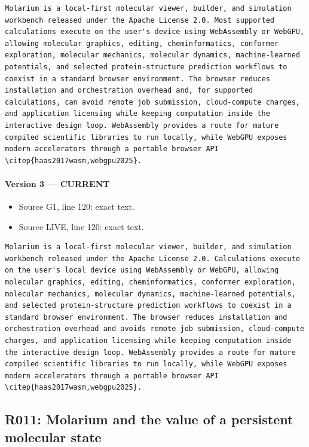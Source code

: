 \documentclass[11pt]{article}
\begin{document}
\begin{lstlisting}
Molarium is a local-first molecular viewer, builder, and simulation workbench released under the Apache License 2.0. Most supported calculations execute on the user's device using WebAssembly or WebGPU, allowing molecular graphics, editing, cheminformatics, conformer exploration, molecular mechanics, molecular dynamics, machine-learned potentials, and selected protein-structure prediction workflows to coexist in a standard browser environment. The browser reduces installation and orchestration overhead and, for supported calculations, can avoid remote job submission, cloud-compute charges, and application licensing while keeping computation inside the interactive design loop. WebAssembly provides a route for mature compiled scientific libraries to run locally, while WebGPU exposes modern accelerators through a portable browser API \citep{haas2017wasm,webgpu2025}.
\end{lstlisting}

\paragraph{Version 3 --- CURRENT}

\begin{itemize}[leftmargin=*]
\item Source G1, line 120: exact text.
\item Source LIVE, line 120: exact text.
\end{itemize}

\begin{lstlisting}
Molarium is a local-first molecular viewer, builder, and simulation workbench released under the Apache License 2.0. Calculations execute on the user's local device using WebAssembly or WebGPU, allowing molecular graphics, editing, cheminformatics, conformer exploration, molecular mechanics, molecular dynamics, machine-learned potentials, and selected protein-structure prediction workflows to coexist in a standard browser environment. The browser reduces installation and orchestration overhead and avoids remote job submission, cloud-compute charges, and application licensing while keeping computation inside the interactive design loop. WebAssembly provides a route for mature compiled scientific libraries to run locally, while WebGPU exposes modern accelerators through a portable browser API \citep{haas2017wasm,webgpu2025}.
\end{lstlisting}

\subsection{R011: Molarium and the value of a persistent molecular state}
\end{document}
